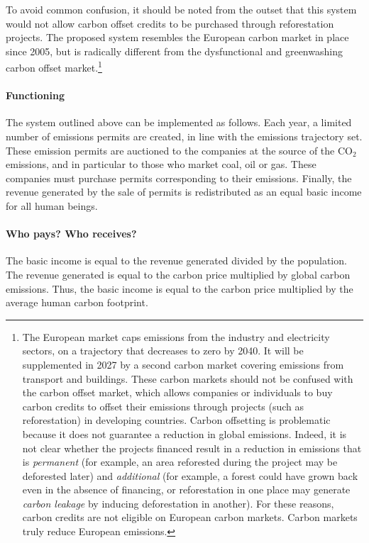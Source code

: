 \documentclass[a5paper,english,openany]{memoir}
\begin{document}
To avoid common confusion, it should be noted from the outset that this system would not allow carbon offset credits to be purchased through reforestation projects. The proposed system resembles the European carbon market in place since 2005, but is radically different from the dysfunctional and greenwashing carbon offset market.\footnote{The European market caps emissions from the industry and electricity sectors, on a trajectory that decreases to zero by 2040. It will be supplemented in 2027 by a second carbon market covering emissions from transport and buildings. These carbon markets should not be confused with the carbon offset market, which allows companies or individuals to buy carbon credits to offset their emissions through projects (such as reforestation) in developing countries. Carbon offsetting is problematic because it does not guarantee a reduction in global emissions. Indeed, it is not clear whether the projects financed result in a reduction in emissions that is \textit{permanent} (for example, an area reforested during the project may be deforested later) and \textit{additional} (for example, a forest could have grown back even in the absence of financing, or reforestation in one place may generate \textit{carbon leakage} by inducing deforestation in another). For these reasons, carbon credits are not eligible on European carbon markets. Carbon markets truly reduce European emissions.}



\paragraph{Functioning}
The system outlined above can be implemented as follows. Each year, a limited number of emissions permits are created, in line with the emissions trajectory set. These emission permits are auctioned to the companies at the source of the CO$_\text{2}$ emissions, and in particular to those who market %
coal, oil or gas. These companies must purchase permits corresponding to their emissions. Finally, the revenue generated by the sale of permits is redistributed as an equal basic income for all human beings. 

\paragraph{Who pays? Who receives?}
The basic income is equal to the revenue generated divided by the population. The revenue generated is equal to the carbon price multiplied by global carbon emissions. Thus, the basic income is equal to the carbon price multiplied by the average human carbon footprint. 
\end{document}
